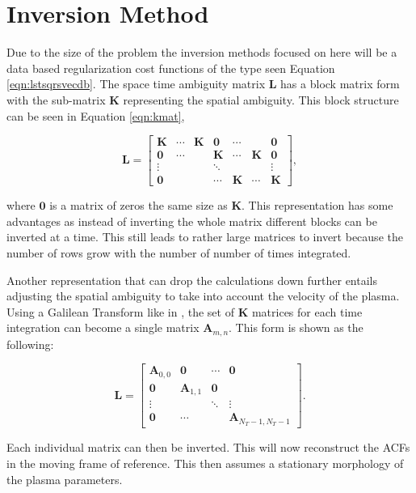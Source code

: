 \section{Inversion Method}
\label{sec:isralg}
Due to the size of the problem the inversion methods focused on here will be a data based regularization cost functions of the type seen Equation \ref{eqn:lstsqrsvecdb}. The space time ambiguity matrix $\mathbf{L}$ has a block matrix form with the sub-matrix $\mathbf{K}$ representing the spatial ambiguity. This block structure can be seen in Equation \ref{eqn:kmat},

\begin{equation}
\label{eqn:kmat}
\mathbf{L}= \begin{bmatrix}\mathbf{K}&\cdots&\mathbf{K}&\mathbf{0}&\cdots&&\mathbf{0}\\
\mathbf{0}&\cdots&&\mathbf{K}&\cdots&\mathbf{K}&\mathbf{0}\\
\vdots&&&\ddots&&&\vdots\\
\mathbf{0}&&&\cdots&\mathbf{K}&\cdots&\mathbf{K}
\end{bmatrix},
\end{equation}

\noindent where $\mathbf{0}$ is a matrix of zeros the same size as $\mathbf{K}$. This representation has some advantages as instead of inverting the whole matrix different blocks can be inverted at a time. This still leads to rather large matrices to invert because the number of rows grow with the number of number of times integrated. 

Another representation that can drop the calculations down further entails adjusting the spatial ambiguity to take into account the velocity of the plasma. Using a Galilean Transform like in \cite{RDS:RDS20236}, the set of $\mathbf{K}$ matrices for each time integration can become a single matrix $\mathbf{A}_{m,n}$. This form is shown as the following:

\begin{equation}
\label{eqn:amat}
\mathbf{L}= \begin{bmatrix}
\mathbf{A}_{0,0}&\mathbf{0}&\cdots&\mathbf{0}\\
 \mathbf{0}&\mathbf{A}_{1,1}&\mathbf{0}&\\
 \vdots&&\ddots&\vdots\\
 \mathbf{0}&\cdots&&\mathbf{A}_{N_T-1,N_T-1}
\end{bmatrix}.
\end{equation}

\noindent Each individual matrix can then be inverted. This will now reconstruct the ACFs in the moving frame of reference. This then assumes a stationary morphology of the plasma parameters. 

